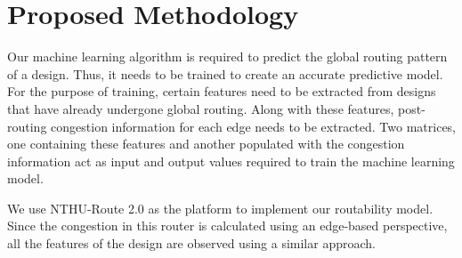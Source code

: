 \section{Proposed Methodology}
\label{sec:methodology}
Our machine learning algorithm is required to predict the global routing pattern of a design. Thus, it needs to be trained to create an accurate predictive model. For the purpose of training, certain features need to be extracted from designs that have already undergone global routing. Along with these features, post-routing congestion information for each edge needs to be extracted. Two matrices, one containing these features and another populated with the congestion information act as input and output values required to train the machine learning model. 

We use NTHU-Route 2.0 \cite{NTHU} as the platform to implement our routability model. Since the congestion in this router is calculated using an edge-based perspective, all the features of the design are observed using a similar approach. 

